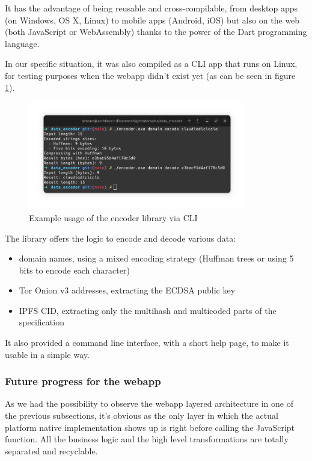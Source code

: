 \documentclass[main.tex]{subfiles}
\begin{document}
It has the advantage of being reusable and cross-compilable, from desktop apps (on Windows, OS X, Linux) to mobile apps (Android, iOS) but also on the web (both JavaScript or WebAssembly) thanks to the power of the Dart programming language.

In our specific situation, it was also compiled as a CLI app that runs on Linux, for testing purposes when the webapp didn't exist yet (as can be seen in figure \ref{fig:data_encoder_cli_usage}).

\begin{figure}[htbp]
    \centering
    \includegraphics[width=0.85\textwidth]{figures/data_encoder_cli_usage}
    \caption{Example usage of the encoder library via CLI}
    \label{fig:data_encoder_cli_usage}
\end{figure}

The library offers the logic to encode and decode various data:
\begin{itemize}
    \item domain names, using a mixed encoding strategy (Huffman trees or using 5 bits to encode each character)
    \item Tor Onion v3 addresses, extracting the ECDSA public key
    \item IPFS CID, extracting only the multihash and multicoded parts of the specification
\end{itemize}

It also provided a command line interface, with a short help page, to make it usable in a simple way.

\subsubsection{Future progress for the webapp}
As we had the possibility to observe the webapp layered architecture in one of the previous subsections, it's obvious as the only layer in which the actual platform native implementation shows up is right before calling the JavaScript function. All the business logic and the high level transformations are totally separated and recyclable.
\end{document}
